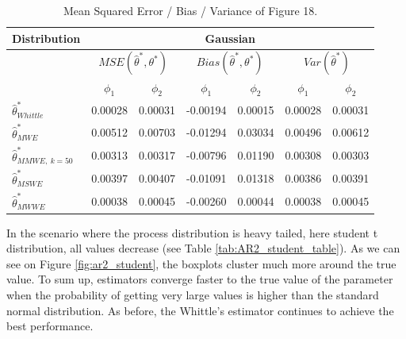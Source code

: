 \documentclass[
  11pt,
]{article}
\begin{document}
\begin{table}[h]
\centering
\begin{tabular}{|l|c|c|c|c|c|c|}
\hline
\multicolumn{1}{|c|}{\textbf{Distribution}} & \multicolumn{6}{c|}{\textbf{Gaussian}}                                                                                                                           \\ \hline
\textbf{}                                   & \multicolumn{2}{c|}{$MSE(\hat \theta^*, \theta^*)$} & \multicolumn{2}{c|}{$Bias(\hat \theta^*, \theta^*)$} & \multicolumn{2}{c|}{$Var(\hat \theta^*)$} \\ \hline
                                            & $\phi_1$                 & $\phi_2$                 & $\phi_1$                  & $\phi_2$                 & $\phi_1$                 & $\phi_2$                 \\ \hline
$\hat \theta^*_{Whittle}$                   & 0.00028                  & 0.00031                  & -0.00194                  & 0.00015                  & 0.00028                  & 0.00031                  \\ \hline
$\hat \theta^*_{MWE}$                       & 0.00512                  & 0.00703                  & -0.01294                  & 0.03034                  & 0.00496                  & 0.00612                  \\ \hline
$\hat \theta^*_{MMWE, \ k = 50}$            & 0.00313                  & 0.00317                  & -0.00796                  & 0.01190                  & 0.00308                  & 0.00303                  \\ \hline
$\hat \theta^*_{MSWE}$                      & 0.00397                  & 0.00407                  & -0.01091                  & 0.01318                  & 0.00386                  & 0.00391                  \\ \hline
$\hat \theta^*_{MWWE}$                      & 0.00038                  & 0.00045                  & -0.00260                  & 0.00044                  & 0.00038                  & 0.00045                  \\ \hline
\end{tabular}
\caption{Mean Squared Error / Bias / Variance of Figure 18.}
\label{tab:AR2_gaussian_table}
\end{table}

In the scenario where the process distribution is heavy tailed, here
student t distribution, all values decrease (see Table
\ref{tab:AR2_student_table}). As we can see on Figure
\ref{fig:ar2_student}, the boxplots cluster much more around the true
value. To sum up, estimators converge faster to the true value of the
parameter when the probability of getting very large values is higher
than the standard normal distribution. As before, the Whittle's
estimator continues to achieve the best performance.
\end{document}
